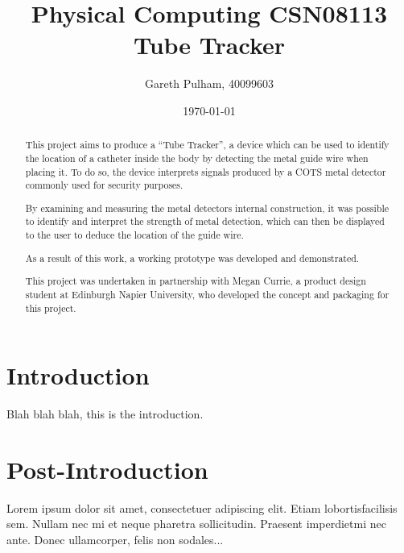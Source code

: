 \documentclass[a4paper]{article}
\begin{document}
    \begin{titlepage}
        \title{Physical Computing CSN08113\\
            Tube Tracker
        }
        \author{Gareth Pulham, 40099603}
        \date{\today}
        \maketitle
        \thispagestyle{empty}

        \begin{abstract}
            This project aims to produce a “Tube Tracker”, a device which can be used to identify the location of a catheter inside the body by detecting the metal guide wire when placing it.
            To do so, the device interprets signals produced by a COTS metal detector commonly used for security purposes.

            By examining and measuring the metal detectors internal construction, it was possible to identify and interpret the strength of metal detection, which can then be displayed to the user to deduce the location of the guide wire.

            As a result of this work, a working prototype was developed and demonstrated.

            This project was undertaken in partnership with Megan Currie, a product design student at Edinburgh Napier University, who developed the concept and packaging for this project.
        \end{abstract}
    \end{titlepage}

    \tableofcontents

    \section{Introduction}
    Blah blah blah, this is the introduction.

    \section{Post-Introduction}
    Lorem  ipsum  dolor  sit  amet,  consectetuer  adipiscing  
    elit.   Etiam  lobortisfacilisis sem.  Nullam nec mi et 
    neque pharetra sollicitudin.  Praesent imperdietmi nec ante. 
    Donec ullamcorper, felis non sodales...
\end{document}
